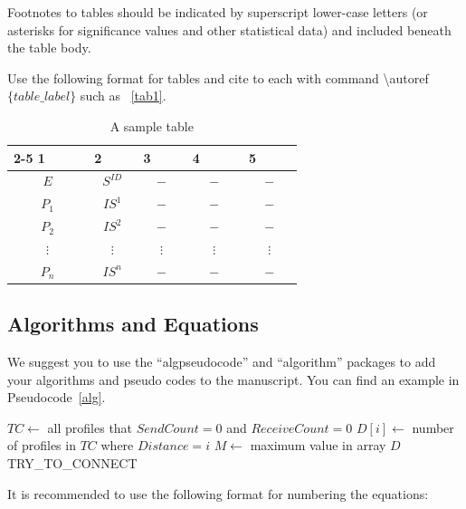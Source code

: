 \documentclass[Print]{../Style/isecure-v24}
\begin{document}
Footnotes to tables should be indicated by superscript lower-case letters (or asterisks for significance values and other statistical data) and included beneath the table body.

Use the following format for tables and cite to each with command \textbackslash autoref$\{table\_label\}$ such as ~\autoref{tab1}.

\begin{table}
	\tiny
	\centering
	\caption{A sample table}\label{tab1}
	\begin{tabular}{ccccc}
		\cline{2-5} 
		1~~~~~ & 2~~~~ & 3~~~~   & 4~~~~~ & 5 ~~~~   \\ 
		\hline 
		$E$ & $S^{ID}$ &  $-$ &  $-$ &  $-$    \\  
		$P_1$ & $IS^1$ & $-$  & $-$   &  $-$   \\ 
		$P_2$ & $IS^2$ &  $-$ & $-$  & $-$  \\ 
		$\vdots$ & $\vdots$ & $\vdots$  & $\vdots$  & $\vdots$   \\  
		$P_n$ & $IS^n$ & $-$  &  $-$ &  $-$  \\ 
		\hline 
	\end{tabular} 
\end{table}


\subsection{Algorithms and Equations} \label{sec:algos}
	
We suggest you to use the ``algpseudocode'' and ``algorithm'' packages to add your algorithms and pseudo codes to the manuscript. You can find an example in Pseudocode~\ref{alg}.

\begin{algorithm}
	\caption{General Behavioral Patterns Detection Rules}
	\label{alg}
	\begin{algorithmic}[1]
		\State $TC \gets$ all profiles that $SendCount=0$ and  $ReceiveCount=0$
		\State $D[i] \gets$ number of profiles in $TC$ where  $Distance=i$
		\State $M \gets$ maximum value in array $D$
		\Return \textsf{TRY\_TO\_CONNECT}
		\EndIf
		\EndFunction		
	\end{algorithmic}
\end{algorithm}
	
It is recommended to use the following format for numbering the equations:
\end{document}
